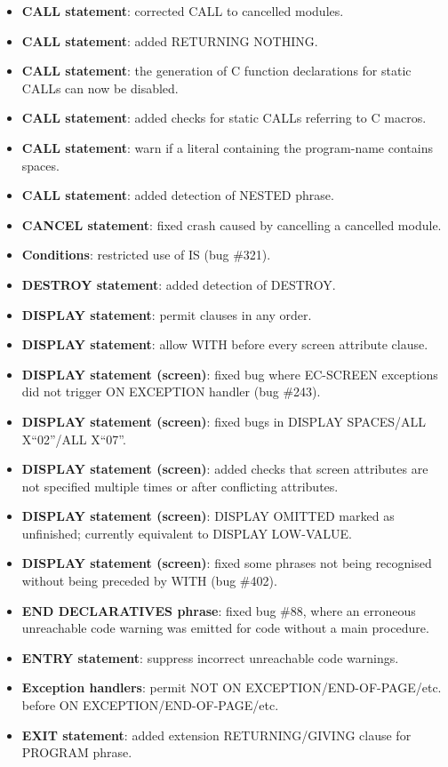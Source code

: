 \begin{itemize}
\item \textbf{CALL statement}: corrected CALL to cancelled modules.
\item \textbf{CALL statement}: added RETURNING NOTHING.
\item \textbf{CALL statement}: the generation of C function declarations for static CALLs can now be disabled.
\item \textbf{CALL statement}: added checks for static CALLs referring to C macros.
\item \textbf{CALL statement}: warn if a literal containing the program-name contains spaces.
\item \textbf{CALL statement}: added detection of NESTED phrase.
\item \textbf{CANCEL statement}: fixed crash caused by cancelling a cancelled module.
\item \textbf{Conditions}: restricted use of IS (bug \#321).
\item \textbf{DESTROY statement}: added detection of DESTROY.
\item \textbf{DISPLAY statement}: permit clauses in any order.
\item \textbf{DISPLAY statement}: allow WITH before every screen attribute clause.
\item \textbf{DISPLAY statement (screen)}: fixed bug where EC-SCREEN exceptions did not trigger ON EXCEPTION handler (bug \#243).
\item \textbf{DISPLAY statement (screen)}: fixed bugs in DISPLAY SPACES\slash{}ALL X``02''\slash{}ALL X``07''.
\item \textbf{DISPLAY statement (screen)}: added checks that screen attributes are not specified multiple times or after conflicting attributes.
\item \textbf{DISPLAY statement (screen)}: DISPLAY OMITTED marked as unfinished; currently equivalent to DISPLAY LOW-VALUE.
\item \textbf{DISPLAY statement (screen)}: fixed some phrases not being recognised without being preceded by WITH (bug \#402).
\item \textbf{END DECLARATIVES phrase}: fixed bug \#88, where an erroneous unreachable code warning was emitted for code without a main procedure.
\item \textbf{ENTRY statement}: suppress incorrect unreachable code warnings.
\item \textbf{Exception handlers}: permit NOT ON EXCEPTION\slash{}END-OF-PAGE\slash{}etc. before ON EXCEPTION\slash{}END-OF-PAGE\slash{}etc.
\item \textbf{EXIT statement}: added extension RETURNING\slash{}GIVING clause for PROGRAM phrase.

\end{itemize}
